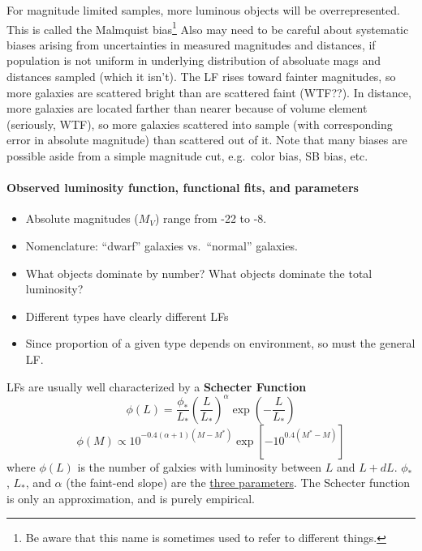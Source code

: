 \documentclass{article}
\newcommand{\mynotes}[1]{\textcolor{cadmiumgreen}{#1}}
\begin{document}
\mynotes{For magnitude limited samples, more luminous objects will be overrepresented.
This is called the Malmquist bias\footnote{Be aware that this name is sometimes
used to refer to different things.} Also may need to be careful about
systematic biases arising from uncertainties in measured magnitudes and
distances, if population is not uniform in underlying distribution of absoluate
mags and distances sampled (which it isn't). The LF rises toward fainter
magnitudes, so more galaxies are scattered bright than are scattered faint
(WTF??). In distance, more galaxies are located farther than nearer
because of volume element (seriously, WTF), so more galaxies
scattered into sample (with corresponding error in absolute magnitude) than
scattered out of it. Note that many biases are possible aside from a simple
magnitude cut, e.g.\ color bias, SB bias, etc.}


\paragraph{Observed luminosity function, functional fits, and parameters}
\begin{itemize}
    \item Absolute magnitudes ($M_{V}$) range from -22 to -8.
    \item Nomenclature: ``dwarf'' galaxies vs.\ ``normal'' galaxies.
    \item What objects dominate by number? What objects dominate the
        total luminosity?
    \item Different types have clearly different LFs
    \item Since proportion of a given type depends on environment, so
        must the general LF.
\end{itemize}

LFs are usually well characterized by a \textbf{Schecter Function}
\[
    \phi(L) = \frac{\phi_{*}}{L_{*}} \left( \frac{L}{L_{*}} \right) ^{\alpha}
    \exp\left( -\frac{L}{L_{*}} \right)
    \]
\[
    \phi(M) \propto 10^{ -0.4 \left( \alpha + 1 \right)
    \left( M - M^{*} \right) }
    \exp \left[ -10^{ 0.4(M^{*} - M) } \right]
    \]
where $\phi(L)$ is the number of galxies with luminosity between
$L$ and $L + dL$.  $\phi_{*}$, $L_{*}$, and $\alpha$ (the faint-end slope)
are the
\href{http://astronomy.nmsu.edu/holtz/a555/resources/schechter.gif}
{three parameters}. The Schecter function is only an approximation, and
is purely empirical.
\end{document}
